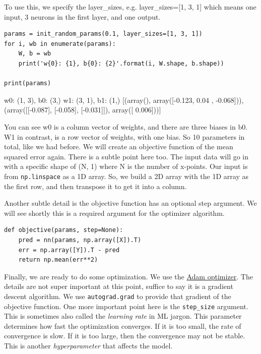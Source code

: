 \documentclass[11pt]{article}
\begin{document}
To use this, we specify the layer\_sizes, e.g. layer\_sizes=[1, 3, 1] which means one input, 3 neurons in the first layer, and one output.

\begin{verbatim}
params = init_random_params(0.1, layer_sizes=[1, 3, 1])
for i, wb in enumerate(params):
    W, b = wb
    print('w{0}: {1}, b{0}: {2}'.format(i, W.shape, b.shape))

print(params)
\end{verbatim}

w0: (1, 3), b0: (3,)
w1: (3, 1), b1: (1,)
[(array(), array([-0.123,  0.04 , -0.068])), (array([[-0.087],
       [-0.058],
       [-0.031]]), array([ 0.006]))]

You can see w0 is a column vector of weights, and there are three biases in b0. W1 in contrast, is a row vector of weights, with one bias. So 10 parameters in total, like we had before. We will create an objective function of the mean squared error again. There is a subtle point here too. The input data will go in with a specific shape of (N, 1) where N is the number of x-points. Our input is from \texttt{np.linspace} as a 1D array. So, we build a 2D array with the 1D array as the first row, and then transpose it to get it into a column.

Another subtle detail is the objective function has an optional step argument. We will see shortly this is a required argument for the optimizer algorithm.

\begin{verbatim}
def objective(params, step=None):
    pred = nn(params, np.array([X]).T)
    err = np.array([Y]).T - pred
    return np.mean(err**2)
\end{verbatim}

Finally, we are ready to do some optimization. We use the \href{https://machinelearningmastery.com/adam-optimization-algorithm-for-deep-learning/}{Adam optimizer}. The details are not super important at this point, suffice to say it is a gradient descent algorithm. We use \texttt{autograd.grad} to provide that gradient of the objective function. One more important point here is the \texttt{step\_size} argument. This is sometimes also called the \emph{learning rate} in ML jargon. This parameter determines how fast the optimization converges. If it is too small, the rate of convergence is slow. If it is too large, then the convergence may not be stable. This is another \emph{hyperparameter} that affects the model.
\end{document}
